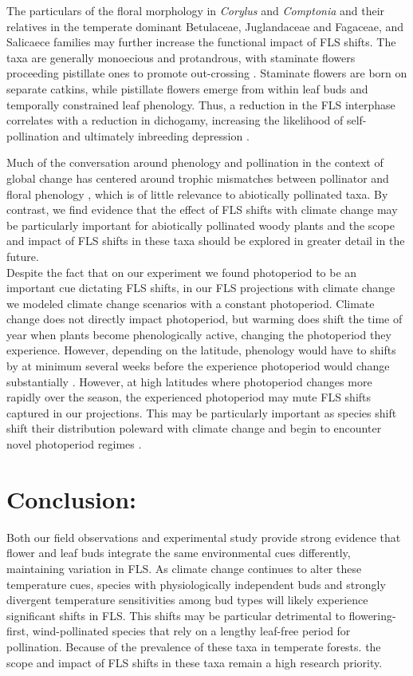 \documentclass[11pt]{article}
\begin{document}
\noindent The particulars of the floral morphology in \textit{Corylus} and \textit{Comptonia} and their relatives in the temperate dominant Betulaceae, Juglandaceae and Fagaceae, and Salicaece families may further increase the functional impact of FLS shifts. The taxa are generally monoecious and protandrous, with staminate flowers proceeding pistillate ones to promote out-crossing \citep{}.  Staminate flowers are born on separate catkins, while pistillate flowers emerge from within leaf buds and temporally constrained leaf phenology. Thus, a reduction in the FLS interphase correlates with a reduction in dichogamy, increasing the likelihood of self-pollination and ultimately inbreeding depression \citep{}.

\noindent Much of the conversation around phenology and pollination in the context of global change has centered around trophic mismatches between pollinator and floral phenology \citep{}, which is of little relevance to abiotically pollinated taxa. By contrast, we find evidence that the effect of FLS shifts with climate change may be particularly important for abiotically pollinated woody plants and the scope and impact of FLS shifts in these taxa should be explored in greater detail in the future.\\ %

\noindent Despite the fact that on our experiment we found photoperiod to be an important cue dictating FLS shifts, in our FLS projections with climate change we modeled climate change scenarios with a constant photoperiod. Climate change does not directly impact photoperiod, but warming does shift the time of year when plants become phenologically active, changing the photoperiod they experience. However, depending on the latitude, phenology would have to shifts by at minimum several weeks before the experience photoperiod would change substantially \citep{Ettinger}. However, at high latitudes where photoperiod changes more rapidly over the season, the experienced photoperiod may mute FLS shifts captured in our projections. This may be particularly important as species shift shift their distribution poleward with climate change and begin to encounter novel photoperiod regimes \citep{}.\\

\section*{Conclusion:}
Both our field observations and experimental study provide strong evidence that flower and leaf buds integrate the same environmental cues differently, maintaining variation in FLS. As climate change continues to alter these temperature cues, species with physiologically independent buds and strongly divergent temperature sensitivities among bud types will likely experience significant shifts in FLS. This shifts may be particular detrimental to flowering-first, wind-pollinated species that rely on a lengthy leaf-free period for pollination. Because of the prevalence of these taxa in temperate forests. the scope and impact of FLS shifts in these taxa remain a high research priority.\\
\end{document}
